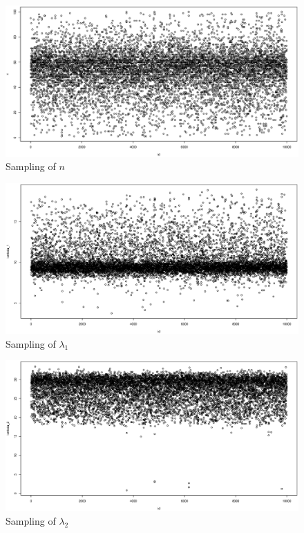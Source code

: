 \documentclass[12pt]{article}
\begin{document}
\begin{figure}
\caption{Sampling of $n$}
\centering
	\includegraphics[width=5in]{sampling_n.eps}
\end{figure}

\begin{figure}
\caption{Sampling of $\lambda_1$}
\centering
	\includegraphics[width=5in]{sampling_lbd1.eps}
\end{figure}

\begin{figure}
\caption{Sampling of $\lambda_2$}
\centering
	\includegraphics[width=5in]{sampling_lbd2.eps}
\end{figure}




\end{document}
